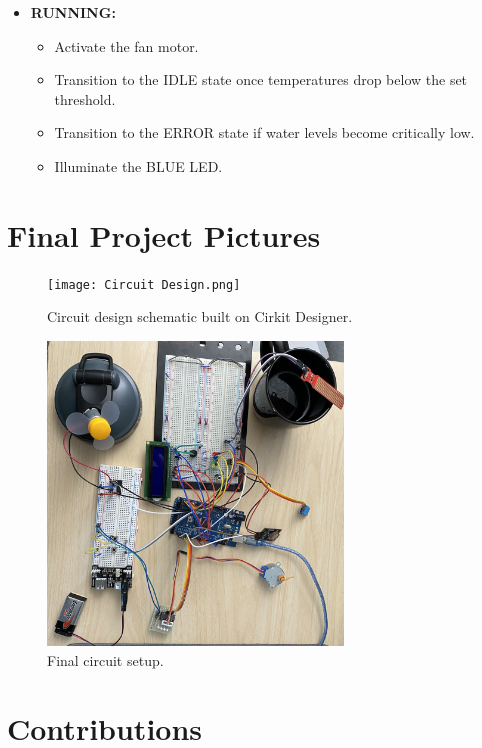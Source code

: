 \documentclass{article}
\begin{document}
\begin{itemize}
    \item \textbf{RUNNING:}
    \begin{itemize}
        \item Activate the fan motor.
        \item Transition to the IDLE state once temperatures drop below the set threshold.
        \item Transition to the ERROR state if water levels become critically low.
        \item Illuminate the BLUE LED.
    \end{itemize}
\end{itemize}



\section{Final Project Pictures} 
\begin{figure}[H]
    \centering
    \texttt{[image: Circuit Design.png]}
    \caption{Circuit design schematic built on Cirkit Designer.}
    \label{fig:1}
\end{figure}

\begin{figure}[H]
    \centering
    \includegraphics[angle=0,width=0.7\textwidth]{finallabCircuit.jpg}
    \caption{Final circuit setup.}
    \label{fig:1}
\end{figure}

\section{Contributions}
\end{document}
